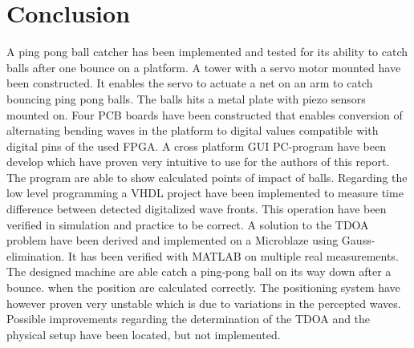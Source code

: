 \chapter{Conclusion}
\label{chap:conclusion}
	A ping pong ball catcher has been implemented and tested for its ability to catch balls after one bounce on a platform.
	A tower with a servo motor mounted have been constructed. It enables the servo to actuate a net on an arm to catch bouncing ping pong balls.
	The balls hits a metal plate with piezo sensors mounted on. 
	Four PCB boards have been constructed that enables conversion of alternating bending waves in the platform to digital values compatible with digital pins of the used FPGA.
	A cross platform GUI PC-program have been develop which have proven very intuitive to use for the authors of this report. 
	The program are able to show calculated points of impact of balls.
	Regarding the low level programming a VHDL project have been implemented to measure time difference between detected digitalized wave fronts. This operation have been verified in simulation and practice to be correct.
	A solution to the TDOA problem have been derived and implemented on a Microblaze using Gauss-elimination. 
	It has been verified with MATLAB on multiple real measurements.
	The designed machine are able catch a ping-pong ball on its way down after a bounce. when the position are calculated correctly.
	The positioning system have however proven very unstable which is due to variations in the percepted waves. 
	Possible improvements regarding the determination of the TDOA and the physical setup have been located, but not implemented.  
	
	
	
